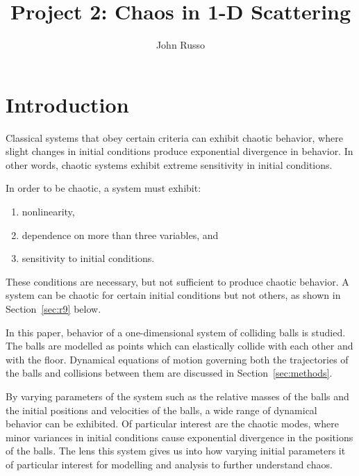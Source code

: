 \documentclass[pra,twocolumn,showpacs,amsmath,amssymb, aps, 10pt]{revtex4-1}
\begin{document}
\title{Project 2: Chaos in 1-D Scattering}


\author{John Russo}

\begin{abstract}
\end{abstract}



\maketitle

\section{Introduction} \label{sec:intro}

Classical systems that obey certain criteria can exhibit chaotic behavior, where
slight changes in initial conditions produce exponential divergence in behavior.
In other words, chaotic systems exhibit extreme sensitivity in initial
conditions. \cite{taylor}

In order to be chaotic, a system must exhibit\cite{taylor}:
\begin{enumerate}
  \item nonlinearity, \label{nonlinearity}
  \item dependence on more than three variables, and \label{dependence}
  \item sensitivity to initial conditions. \label{sensitivity}
\end{enumerate}

These conditions are necessary, but not sufficient to produce chaotic behavior.
A system can be chaotic for certain initial conditions but not others, as shown
in Section~\ref{sec:r9} below.

In this paper, behavior of a one-dimensional system of colliding balls is studied.
The balls are modelled as points which can elastically collide with each other
and with the floor. Dynamical equations of motion governing both the trajectories
of the balls and collisions between them are discussed
in Section~\ref{sec:methods}.

By varying parameters of the system such as the relative masses of the balls and
the initial positions and velocities of the balls, a wide range of dynamical
behavior can be exhibited. Of particular interest are the chaotic modes, where
minor variances in initial conditions cause exponential divergence in the positions
of the balls. The lens this system gives us into how varying initial
parameters it of particular interest for modelling and analysis to further
understand chaos.
\end{document}
